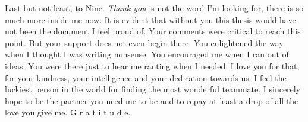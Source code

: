 \documentclass[english, a4paper, 12pt]{article}
\begin{document}
Last but not least, to Nine. \textit{Thank you} is not the word I'm looking for, there is so much more inside me now. It is evident that without you this thesis would have not been the document I feel proud of. Your comments were critical to reach this point. But your support does not even begin there. You enlightened the way when I thought I was writing nonsense. You encouraged me when I ran out of ideas. You were there just to hear me ranting when I needed. I love you for that, for your kindness, your intelligence and your dedication towards us. I feel the luckiest person in the world for finding the most wonderful teammate. I sincerely hope to be the partner you need me to be and to repay at least a drop of all the love you give me. G r a t i t u d e.



\end{document}
